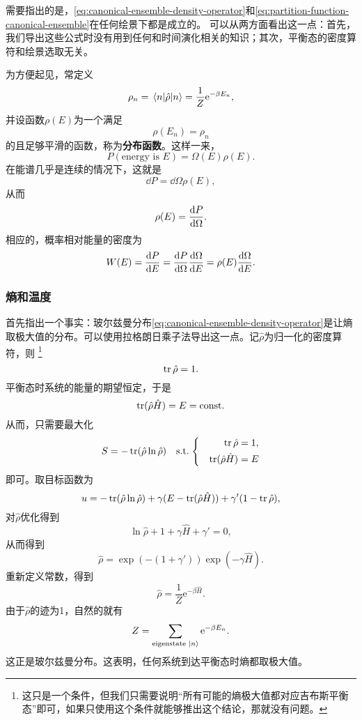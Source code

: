 \documentclass[hyperref, UTF8, a4paper]{ctexart}
\newcommand*{\ee}{\mathrm{e}}
\newcommand*{\const}{\mathrm{const}}
\newenvironment{bigcase}{\left\{\quad\begin{aligned}}{\end{aligned}\right.}
\begin{document}
需要指出的是，\eqref{eq:canonical-ensemble-density-operator}和\eqref{eq:partition-function-canonical-ensemble}在任何绘景下都是成立的。
可以从两方面看出这一点：首先，我们导出这些公式时没有用到任何和时间演化相关的知识；其次，平衡态的密度算符和绘景选取无关。

为方便起见，常定义
\begin{equation}
    \rho_n = \mel{n}{\hat{\rho}}{n} = \frac{1}{Z} \ee^{-\beta E_n},
\end{equation}
并设函数$\rho(E)$为一个满足
\begin{equation}
    \rho(E_n) = \rho_n
\end{equation}
的且足够平滑的函数，称为\textbf{分布函数}。这样一来，
\begin{equation}
    P(\text{energy is $E$}) = \Omega(E) \rho(E).
\end{equation}
在能谱几乎是连续的情况下，这就是
\[
    \dd{P} = \dd{\Omega} \rho(E),
\]
从而
\begin{equation}
    \rho(E) = \dv{P}{\Omega}.
\end{equation}
相应的，概率相对能量的密度为
\begin{equation}
    W(E) = \dv{P}{E} = \dv{P}{\Omega} \dv{\Omega}{E} = \rho(E) \dv{\Omega}{E}.
    \label{eq:canonical-ensemble-probablity-density}
\end{equation}

\subsubsection{熵和温度}

首先指出一个事实：玻尔兹曼分布\eqref{eq:canonical-ensemble-density-operator}是让熵取极大值的分布。可以使用拉格朗日乘子法导出这一点。记$\hat{\rho}$为归一化的密度算符，则%
\footnote{这只是一个条件，但我们只需要说明“所有可能的熵极大值都对应吉布斯平衡态”即可，如果只使用这个条件就能够推出这个结论，那就没有问题。}
\[
    \trace \hat{\rho} = 1.
\]
平衡态时系统的能量的期望恒定，于是
\[
    \trace (\hat{\rho} \hat{H}) = E = \const.
\]
从而，只需要最大化
\[
    S = - \trace (\hat{\rho} \ln \hat{\rho}) \quad \text{s.t.} \; \begin{bigcase}
        \trace \hat{\rho} &= 1, \\
        \trace (\hat{\rho} \hat{H}) &= E
    \end{bigcase}
\]
即可。取目标函数为
\[
    u = - \trace (\hat{\rho} \ln \hat{\rho}) + \gamma (E - \trace (\hat{\rho} \hat{H})) + \gamma' (1 - \trace \hat{\rho}),
\]
对$\hat{\rho}$优化得到
\[
    \ln \hat{\rho} + 1 + \gamma \hat{H} + \gamma' = 0,
\]
从而得到
\[
    \hat{\rho} = \exp (-(1+\gamma')) \exp(- \gamma \hat{H}).
\]
重新定义常数，得到
\[
    \hat{\rho} = \frac{1}{Z} \ee^{-\beta \hat{H}}.
\]
由于$\hat{\rho}$的迹为1，自然的就有
\[
    Z = \sum_\text{eigenstate $\ket{n}$} \ee^{-\beta E_n}.
\]
这正是玻尔兹曼分布。这表明，任何系统到达平衡态时熵都取极大值。
\end{document}
